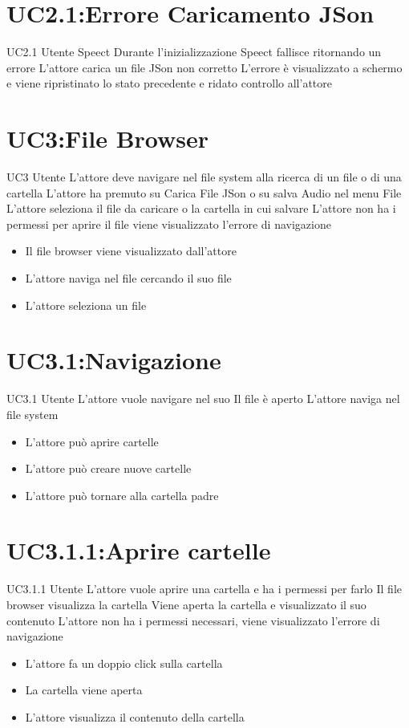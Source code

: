 \documentclass[../AnalisideiRequisiti.tex]{subfiles}
\begin{document}
	\section{UC2.1:Errore Caricamento JSon}
	\UserCase
	{UC2.1}
	{Utente}
	{Speect}
	{Durante l'inizializzazione Speect fallisce ritornando un errore }
	{L'attore carica un file JSon non corretto}
	{L'errore è visualizzato a schermo e viene ripristinato lo stato precedente e ridato controllo all'attore}
	{}
	{}
	
	\section{UC3:File Browser}
	\UserCase
	{UC3}
	{Utente}
	{}
	{L'attore deve navigare nel file system alla ricerca di un file o di una cartella}
	{L'attore ha premuto su Carica File JSon o su salva Audio nel menu File}
	{L'attore seleziona il file da caricare o la cartella in cui salvare}
	{L'attore non ha i permessi per aprire il file viene visualizzato l'errore di navigazione }
	{
		\begin{itemize}
			\item{} Il file browser viene visualizzato dall'attore
			\item{} L'attore naviga nel file  cercando il suo file 
			\item{} L'attore seleziona un file 
			
		\end{itemize}
	}
	\section{UC3.1:Navigazione}
	\UserCase
	{UC3.1}
	{Utente}
	{}
	{L'attore vuole navigare nel suo }
	{Il file  è aperto}
	{L'attore naviga nel file system}
	{}
	{
		\begin{itemize}
			\item{} L'attore può aprire cartelle 
			\item{} L'attore può creare nuove cartelle 
			\item{} L'attore può tornare alla cartella padre 
		\end{itemize}
	}	
	\section{UC3.1.1:Aprire cartelle}
	\UserCase
	{UC3.1.1}
	{Utente}
	{}
	{L'attore vuole aprire una cartella e ha i permessi per farlo}
	{Il file browser visualizza la cartella}
	{Viene aperta la cartella e visualizzato il suo contenuto}
	{L'attore non ha i permessi necessari, viene visualizzato l'errore di navigazione }
	{
		\begin{itemize}
			\item{} L'attore fa un doppio click sulla cartella
			\item{} La cartella viene aperta
			\item{} L'attore visualizza il contenuto della cartella
		\end{itemize}
	}
\end{document}
